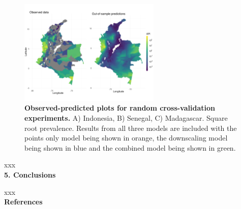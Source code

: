 \documentclass[11pt]{article}
\begin{document}
\begin{figure}
\centering
\includegraphics[trim={0 40mm 0 100mm}, width = 0.6\textwidth]{figs/col_obs_pred_map_ml.png} %
\caption{{\bf Observed-predicted plots for random cross-validation experiments.}
A) Indonesia, B) Senegal, C) Madagascar. Square root prevalence.
Results from all three models are included with the points only model being shown in orange, the downscaling model being shown in blue and the combined model being shown in green.
}
\label{randompredobspointfacet}
\end{figure}


xxx  \\

{\bf 5. Conclusions}


xxx\\

{\bf References}\\

 

\end{document}
